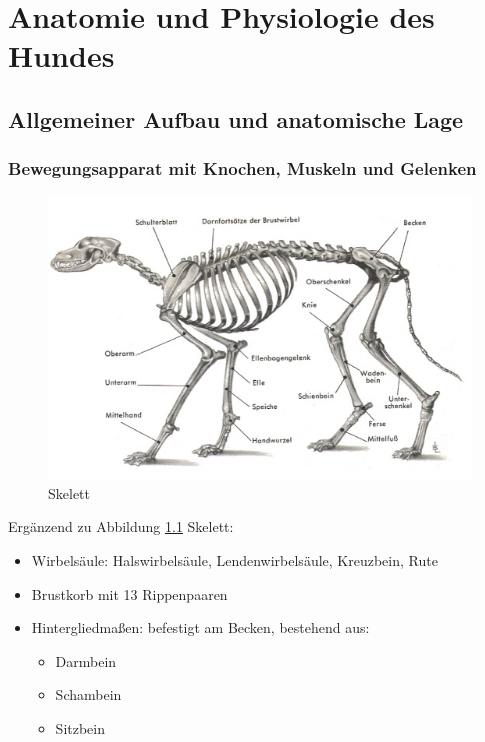 \chapter{Anatomie und Physiologie des Hundes}


\section{Allgemeiner Aufbau und anatomische Lage}

    \subsection{Bewegungsapparat mit Knochen, Muskeln und Gelenken}
    \begin{figure}[ht]
    \centering
    \includegraphics[width=1.0\textwidth]{./bilder/anatomie1.jpg}
    \caption{Skelett}
    \label{Skelett}
    \end{figure}

    Ergänzend zu Abbildung \ref{Skelett} Skelett:
    \begin{itemize}
        \item Wirbelsäule: Halswirbelsäule, Lendenwirbelsäule, Kreuzbein, Rute
        \item Brustkorb mit 13 Rippenpaaren
        \item Hintergliedmaßen: befestigt am Becken, bestehend aus:
        \begin{itemize}
            \item Darmbein
            \item Schambein
            \item Sitzbein
        \end{itemize}
    \end{itemize}

